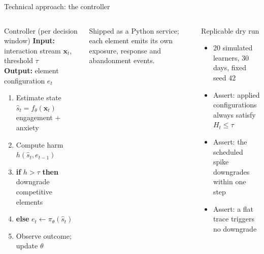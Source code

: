 \documentclass[10pt]{beamer}
\begin{document}
\begin{frame}{Technical approach: the controller}
\begin{columns}[T]
    \begin{block}{Controller (per decision window)}
        \footnotesize
        \textbf{Input:} interaction stream $\mathbf{x}_t$, threshold $\tau$\\
        \textbf{Output:} element configuration $e_t$
        \vspace{2pt}
        \begin{enumerate}\itemsep1pt
            \item Estimate state $\hat{s}_t = f_\theta(\mathbf{x}_t)$ \hfill {\tiny engagement + anxiety}
            \item Compute harm $h(\hat{s}_t, e_{t-1})$
            \item \textbf{if} $h > \tau$ \textbf{then} downgrade competitive elements
            \item \textbf{else} $e_t \leftarrow \pi_\theta(\hat{s}_t)$
            \item Observe outcome; update $\theta$
        \end{enumerate}
    \end{block}
    \normalsize
    \vspace{0.1cm}
    Shipped as a Python service; each element emits its own exposure,
    response and abandonment events.
    \begin{block}{Replicable dry run}\small
        \begin{itemize}\itemsep1pt
            \item 20 simulated learners, 30 days, fixed seed 42
            \item Assert: applied configurations always satisfy $H_t \le \tau$
            \item Assert: the scheduled spike downgrades within one step
            \item Assert: a flat trace triggers no downgrade
        \end{itemize}
    \end{block}
\end{columns}
\end{frame}
\end{document}

